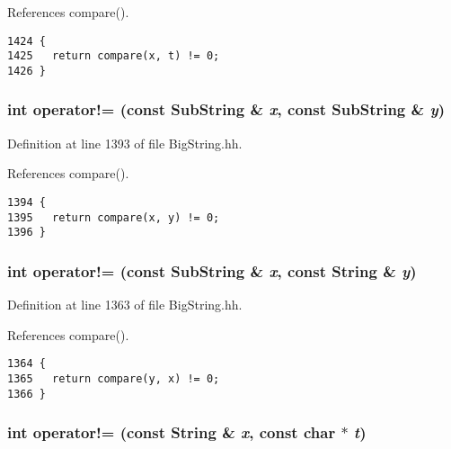 References compare().



\footnotesize\begin{verbatim}1424 {
1425   return compare(x, t) != 0;
1426 }
\end{verbatim}\normalsize 
{}
\subsubsection{\setlength{\rightskip}{0pt plus 5cm}int operator!= (const {\bf Sub\-String} \& {\em x}, const {\bf Sub\-String} \& {\em y})\hspace{0.3cm}{\tt  [inline]}}\label{BigString_8hh_a111}




Definition at line 1393 of file Big\-String.hh.

References compare().



\footnotesize\begin{verbatim}1394 {
1395   return compare(x, y) != 0;
1396 }
\end{verbatim}\normalsize 
{}
\subsubsection{\setlength{\rightskip}{0pt plus 5cm}int operator!= (const {\bf Sub\-String} \& {\em x}, const {\bf String} \& {\em y})\hspace{0.3cm}{\tt  [inline]}}\label{BigString_8hh_a105}




Definition at line 1363 of file Big\-String.hh.

References compare().



\footnotesize\begin{verbatim}1364 {
1365   return compare(y, x) != 0;
1366 }
\end{verbatim}\normalsize 
{}
\subsubsection{\setlength{\rightskip}{0pt plus 5cm}int operator!= (const {\bf String} \& {\em x}, const char $\ast$ {\em t})\hspace{0.3cm}{\tt  [inline]}}\label{BigString_8hh_a99}




